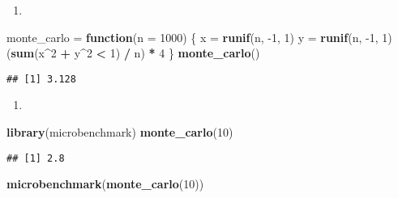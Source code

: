 \documentclass[
]{article}
\newenvironment{Shaded}{\begin{snugshade}}{\end{snugshade}}
\newcommand{\ControlFlowTok}[1]{\textcolor[rgb]{0.13,0.29,0.53}{\textbf{#1}}}
\newcommand{\DataTypeTok}[1]{\textcolor[rgb]{0.13,0.29,0.53}{#1}}
\newcommand{\DecValTok}[1]{\textcolor[rgb]{0.00,0.00,0.81}{#1}}
\newcommand{\KeywordTok}[1]{\textcolor[rgb]{0.13,0.29,0.53}{\textbf{#1}}}
\newcommand{\NormalTok}[1]{#1}
\newcommand{\OperatorTok}[1]{\textcolor[rgb]{0.81,0.36,0.00}{\textbf{#1}}}
\newcommand{\StringTok}[1]{\textcolor[rgb]{0.31,0.60,0.02}{#1}}
\providecommand{\tightlist}{%
  \setlength{\itemsep}{0pt}\setlength{\parskip}{0pt}}
\begin{document}
\begin{enumerate}
\def\labelenumi{\arabic{enumi}.}
\tightlist
\item
\end{enumerate}

\begin{Shaded}
\begin{Highlighting}[]
\NormalTok{monte\_carlo =}\StringTok{ }\ControlFlowTok{function}\NormalTok{(}\DataTypeTok{n =} \DecValTok{1000}\NormalTok{) \{}
\NormalTok{   x =}\StringTok{ }\KeywordTok{runif}\NormalTok{(n, }\DecValTok{{-}1}\NormalTok{, }\DecValTok{1}\NormalTok{)}
\NormalTok{   y =}\StringTok{ }\KeywordTok{runif}\NormalTok{(n, }\DecValTok{{-}1}\NormalTok{, }\DecValTok{1}\NormalTok{)}
\NormalTok{   (}\KeywordTok{sum}\NormalTok{(x}\OperatorTok{\^{}}\DecValTok{2} \OperatorTok{+}\StringTok{ }\NormalTok{y}\OperatorTok{\^{}}\DecValTok{2} \OperatorTok{\textless{}}\StringTok{ }\DecValTok{1}\NormalTok{) }\OperatorTok{/}\StringTok{ }\NormalTok{n) }\OperatorTok{*}\StringTok{ }\DecValTok{4}
\NormalTok{\}}
\KeywordTok{monte\_carlo}\NormalTok{()}
\end{Highlighting}
\end{Shaded}

\begin{verbatim}
## [1] 3.128
\end{verbatim}

\begin{enumerate}
\def\labelenumi{\arabic{enumi}.}
\setcounter{enumi}{1}
\tightlist
\item
\end{enumerate}

\begin{Shaded}
\begin{Highlighting}[]
\KeywordTok{library}\NormalTok{(microbenchmark)}
\KeywordTok{monte\_carlo}\NormalTok{(}\DecValTok{10}\NormalTok{)}
\end{Highlighting}
\end{Shaded}

\begin{verbatim}
## [1] 2.8
\end{verbatim}

\begin{Shaded}
\begin{Highlighting}[]
\KeywordTok{microbenchmark}\NormalTok{(}\KeywordTok{monte\_carlo}\NormalTok{(}\DecValTok{10}\NormalTok{))}
\end{Highlighting}
\end{Shaded}
\end{document}
